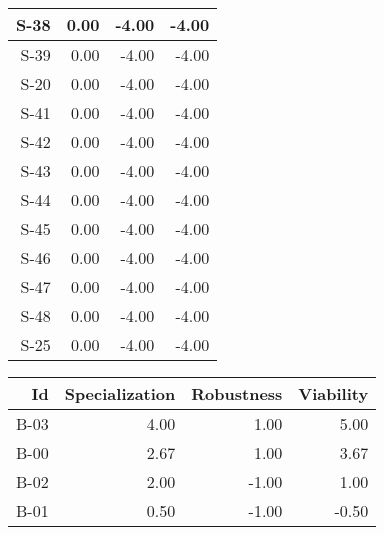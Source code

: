 \begin{tabular}{ | r | r | r | r | }
    \hline
                  S-38  &            0.00  &           -4.00  &           -4.00  \\
    \hline
                  S-39  &            0.00  &           -4.00  &           -4.00  \\
    \hline
                  S-20  &            0.00  &           -4.00  &           -4.00  \\
    \hline
                  S-41  &            0.00  &           -4.00  &           -4.00  \\
    \hline
                  S-42  &            0.00  &           -4.00  &           -4.00  \\
    \hline
                  S-43  &            0.00  &           -4.00  &           -4.00  \\
    \hline
                  S-44  &            0.00  &           -4.00  &           -4.00  \\
    \hline
                  S-45  &            0.00  &           -4.00  &           -4.00  \\
    \hline
                  S-46  &            0.00  &           -4.00  &           -4.00  \\
    \hline
                  S-47  &            0.00  &           -4.00  &           -4.00  \\
    \hline
                  S-48  &            0.00  &           -4.00  &           -4.00  \\
    \hline
                  S-25  &            0.00  &           -4.00  &           -4.00  \\
    \hline
\end{tabular}


\begin{tabular}{ | r | r | r | r | }
    \hline
                    Id  &  Specialization  &      Robustness  &       Viability  \\
    \hline
    \hline
                  B-03  &            4.00  &            1.00  &            5.00  \\
    \hline
                  B-00  &            2.67  &            1.00  &            3.67  \\
    \hline
                  B-02  &            2.00  &           -1.00  &            1.00  \\
    \hline
                  B-01  &            0.50  &           -1.00  &           -0.50  \\
    \hline
\end{tabular}


